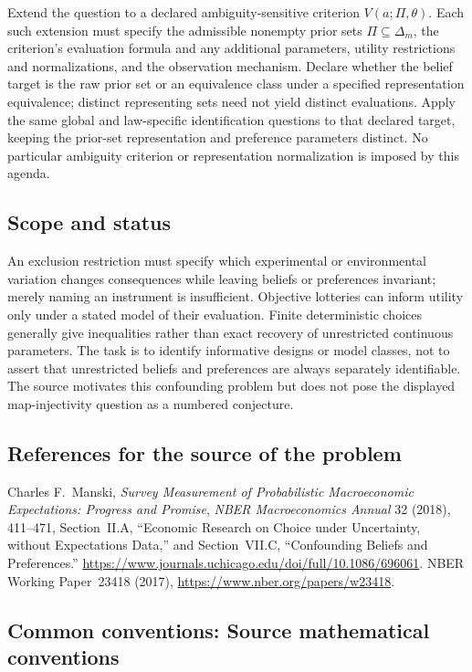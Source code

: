 \documentclass[11pt,a4paper]{article}
\begin{document}
Extend the question to a declared ambiguity-sensitive criterion $V(a;\Pi,\theta)$. Each such extension must specify the admissible nonempty prior sets $\Pi\subseteq\Delta_m$, the criterion's evaluation formula and any additional parameters, utility restrictions and normalizations, and the observation mechanism. Declare whether the belief target is the raw prior set or an equivalence class under a specified representation equivalence; distinct representing sets need not yield distinct evaluations. Apply the same global and law-specific identification questions to that declared target, keeping the prior-set representation and preference parameters distinct. No particular ambiguity criterion or representation normalization is imposed by this agenda.
\subsection*{Scope and status}
An exclusion restriction must specify which experimental or environmental variation changes consequences while leaving beliefs or preferences invariant; merely naming an instrument is insufficient. Objective lotteries can inform utility only under a stated model of their evaluation. Finite deterministic choices generally give inequalities rather than exact recovery of unrestricted continuous parameters. The task is to identify informative designs or model classes, not to assert that unrestricted beliefs and preferences are always separately identifiable. The source motivates this confounding problem but does not pose the displayed map-injectivity question as a numbered conjecture.
\subsection*{References for the source of the problem}
Charles F.~Manski, \emph{Survey Measurement of Probabilistic Macroeconomic Expectations: Progress and Promise}, \emph{NBER Macroeconomics Annual} 32 (2018), 411--471, Section~II.A, ``Economic Research on Choice under Uncertainty, without Expectations Data,'' and Section~VII.C, ``Confounding Beliefs and Preferences.'' \url{https://www.journals.uchicago.edu/doi/full/10.1086/696061}. NBER Working Paper~23418 (2017), \url{https://www.nber.org/papers/w23418}.

\subsection*{Common conventions: Source mathematical conventions}
\end{document}
